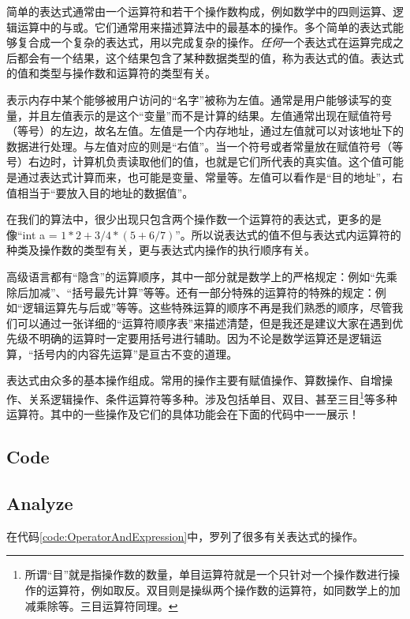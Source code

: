 简单的表达式通常由一个运算符和若干个操作数构成，例如数学中的四则运算、逻辑运算中的与或。它们通常用来描述算法中的最基本的操作。多个简单的表达式能够复合成一个复杂的表达式，用以完成复杂的操作。\emph{任何}一个表达式在运算完成之后都会有一个结果，这个结果包含了某种数据类型的值，称为表达式的值。表达式的值和类型与操作数和运算符的类型有关。

表示内存中某个能够被用户访问的“名字”被称为左值。通常是用户能够读写的变量，并且左值表示的是这个“变量”而不是计算的结果。左值通常出现在赋值符号（等号）的左边，故名左值。左值是一个内存地址，通过左值就可以对该地址下的数据进行处理。与左值对应的则是“右值”。当一个符号或者常量放在赋值符号（等号）右边时，计算机负责读取他们的值，也就是它们所代表的真实值。这个值可能是通过表达式计算而来，也可能是变量、常量等。左值可以看作是“目的地址”，右值相当于“要放入目的地址的数据值”。

在我们的算法中，很少出现只包含两个操作数一个运算符的表达式，更多的是像“int a = $1*2+3/4*(5+6/7)$”。所以说表达式的值不但与表达式内运算符的种类及操作数的类型有关，更与表达式内操作的执行顺序有关。

高级语言都有“隐含”的运算顺序，其中一部分就是数学上的严格规定：例如“先乘除后加减”、“括号最先计算”等等。还有一部分特殊的运算符的特殊的规定：例如“逻辑运算先与后或”等等。这些特殊运算的顺序不再是我们熟悉的顺序，尽管我们可以通过一张详细的“运算符顺序表”来描述清楚，但是我还是建议大家在遇到优先级不明确的运算时一定要用括号进行辅助。因为不论是数学运算还是逻辑运算，“括号内的内容先运算”是亘古不变的道理。

表达式由众多的基本操作组成。常用的操作主要有赋值操作、算数操作、自增操作、关系逻辑操作、条件运算符等多种。涉及包括单目、双目、甚至三目\footnote{所谓“目”就是指操作数的数量，单目运算符就是一个只针对一个操作数进行操作的运算符，例如取反。双目则是操纵两个操作数的运算符，如同数学上的加减乘除等。三目运算符同理。}等多种运算符。其中的一些操作及它们的具体功能会在下面的代码中一一展示！

\subsection{Code}



\subsection{Analyze}
\showremarks

在代码\ref{code:OperatorAndExpression}中，罗列了很多有关表达式的操作。

